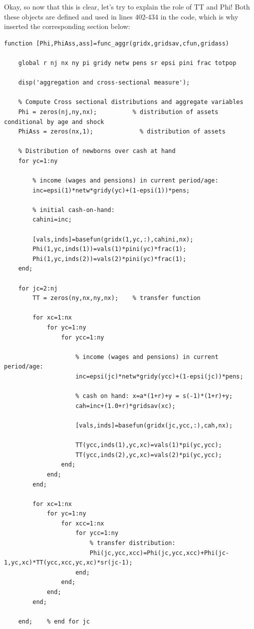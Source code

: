 \documentclass[12pt,a4paper]{article}
\begin{document}
Okay, so now that this is clear, let's try to explain the role of TT and Phi! Both these objects are defined and used in lines 402-434 in the code, which is why  inserted the corresponding section below:

\begin{lstlisting}[frame=single]
    function [Phi,PhiAss,ass]=func_aggr(gridx,gridsav,cfun,gridass)

    global r nj nx ny pi gridy netw pens sr epsi pini frac totpop

    disp('aggregation and cross-sectional measure');

    % Compute Cross sectional distributions and aggregate variables
    Phi = zeros(nj,ny,nx);          % distribution of assets conditional by age and shock
    PhiAss = zeros(nx,1);             % distribution of assets

    % Distribution of newborns over cash at hand
    for yc=1:ny

        % income (wages and pensions) in current period/age:
        inc=epsi(1)*netw*gridy(yc)+(1-epsi(1))*pens;

        % initial cash-on-hand:
        cahini=inc;

        [vals,inds]=basefun(gridx(1,yc,:),cahini,nx);
        Phi(1,yc,inds(1))=vals(1)*pini(yc)*frac(1);
        Phi(1,yc,inds(2))=vals(2)*pini(yc)*frac(1);
    end;

    for jc=2:nj
        TT = zeros(ny,nx,ny,nx);    % transfer function

        for xc=1:nx
            for yc=1:ny
                for ycc=1:ny

                    % income (wages and pensions) in current period/age:
                    inc=epsi(jc)*netw*gridy(ycc)+(1-epsi(jc))*pens;

                    % cash on hand: x=a*(1+r)+y = s(-1)*(1+r)+y;
                    cah=inc+(1.0+r)*gridsav(xc);

                    [vals,inds]=basefun(gridx(jc,ycc,:),cah,nx);

                    TT(ycc,inds(1),yc,xc)=vals(1)*pi(yc,ycc);
                    TT(ycc,inds(2),yc,xc)=vals(2)*pi(yc,ycc);
                end;
            end;
        end;

        for xc=1:nx
            for yc=1:ny
                for xcc=1:nx
                    for ycc=1:ny
                        % transfer distribution:
                        Phi(jc,ycc,xcc)=Phi(jc,ycc,xcc)+Phi(jc-1,yc,xc)*TT(ycc,xcc,yc,xc)*sr(jc-1);
                    end;
                end;
            end;
        end;

    end;    % end for jc
\end{lstlisting}
\end{document}
